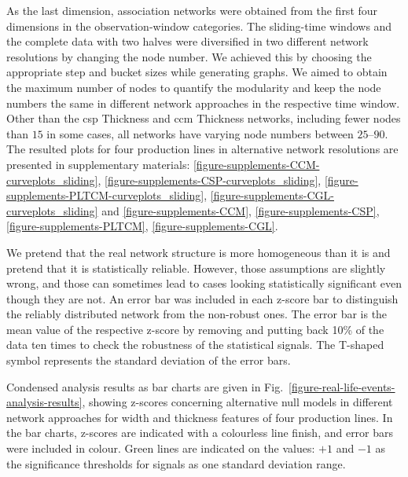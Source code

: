As the last dimension, association networks were obtained from the first four dimensions in the observation-window categories. The sliding-time windows and the complete data with two halves were diversified in two different network resolutions by changing the node number. We achieved this by choosing the appropriate step and bucket sizes while generating graphs. We aimed to obtain the maximum number of nodes to quantify the modularity and keep the node numbers the same in different network approaches in the respective time window. Other than the \acs{csp} Thickness and \acs{ccm} Thickness networks, including fewer nodes than $15$ in some cases, all networks have varying node numbers between $25$--$90$. The resulted plots for four production lines in alternative network resolutions are presented in supplementary materials: \ref{figure-supplements-CCM-curveplots_sliding}, \ref{figure-supplements-CSP-curveplots_sliding}, \ref{figure-supplements-PLTCM-curveplots_sliding}, \ref{figure-supplements-CGL-curveplots_sliding} and \ref{figure-supplements-CCM}, \ref{figure-supplements-CSP}, \ref{figure-supplements-PLTCM}, \ref{figure-supplements-CGL}.

We pretend that the real network structure is more homogeneous than it is and pretend that it is statistically reliable. However, those assumptions are slightly wrong, and those can sometimes lead to cases looking statistically significant even though they are not. An error bar was included in each z-score bar to distinguish the reliably distributed network from the non-robust ones. The error bar is the mean value of the respective z-score by removing and putting back 10\% of the data ten times to check the robustness of the statistical signals. The T-shaped symbol represents the standard deviation of the error bars.

Condensed analysis results as bar charts are given in Fig.~\ref{figure-real-life-events-analysis-results}, showing z-scores concerning alternative null models in different network approaches for width and thickness features of four production lines. In the bar charts, z-scores are indicated with a colourless line finish, and error bars were included in colour. Green lines are indicated on the values: $+1$ and $-1$ as the significance thresholds for signals as one standard deviation range.
\renewcommand{\aa}{Analysis Bar Chart Results:}


\newcommand{\bb}{Modularity Values and Z-scores in Different Network Resolutions}
\newcommand{\cc}{Analysis Curve Plot Results:}
\newcommand{\dd}{Modularity Values and Z-scores in Sliding-time Windows \& Different Network Resolutions}
\newcommand{\ee}{Modularity Values and Z-scores in Discrete-time Windows}

